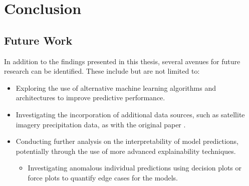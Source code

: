 \chapter{Conclusion}
\label{ch:con}

\section{Future Work}
In addition to the findings presented in this thesis, several avenues for future research can be identified. These include but are not limited to:

\begin{itemize}
    \item Exploring the use of alternative machine learning algorithms and architectures to improve predictive performance.
    \item Investigating the incorporation of additional data sources, such as satellite imagery precipitation data, as with the original paper \citep{Hill2023}.
    \item Conducting further analysis on the interpretability of model predictions, potentially through the use of more advanced explainability techniques.
    \begin{itemize}
        \item Investigating anomalous individual predictions using decision plots or force plots to quantify edge cases for the models.
    \end{itemize}
\end{itemize}